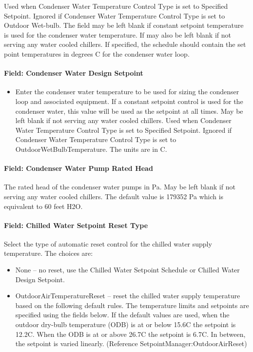 Used when Condenser Water Temperature Control Type is set to Specified Setpoint. Ignored if Condenser Water Temperature Control Type is set to Outdoor Wet-bulb. The field may be left blank if constant setpoint temperature is used for the condenser water temperature. If may also be left blank if not serving any water cooled chillers. If specified, the schedule should contain the set point temperatures in degrees C for the condenser water loop.

\paragraph{Field: Condenser Water Design Setpoint}\label{field-condenser-water-design-setpoint}

\begin{itemize}
\tightlist
\item
  Enter the condenser water temperature to be used for sizing the condenser loop and associated equipment. If a constant setpoint control is used for the condenser water, this value will be used as the setpoint at all times. May be left blank if not serving any water cooled chillers. Used when Condenser Water Temperature Control Type is set to Specified Setpoint. Ignored if Condenser Water Temperature Control Type is set to OutdoorWetBulbTemperature. The units are in C.
\end{itemize}

\paragraph{Field: Condenser Water Pump Rated Head}\label{field-condenser-water-pump-rated-head}

The rated head of the condenser water pumps in Pa. May be left blank if not serving any water cooled chillers. The default value is 179352 Pa which is equivalent to 60 feet H2O.

\paragraph{Field: Chilled Water Setpoint Reset Type}\label{field-chilled-water-setpoint-reset-type}

Select the type of automatic reset control for the chilled water supply temperature. The choices are:

\begin{itemize}
\item
  None -- no reset, use the Chilled Water Setpoint Schedule or Chilled Water Design Setpoint.
\item
  OutdoorAirTemperatureReset -- reset the chilled water supply temperature based on the following default rules. The temperature limits and setpoints are specified using the fields below. If the default values are used, when the outdoor dry-bulb temperature (ODB) is at or below 15.6C the setpoint is 12.2C. When the ODB is at or above 26.7C the setpoint is 6.7C. In between, the setpoint is varied linearly. (Reference SetpointManager:OutdoorAirReset)
\end{itemize}

